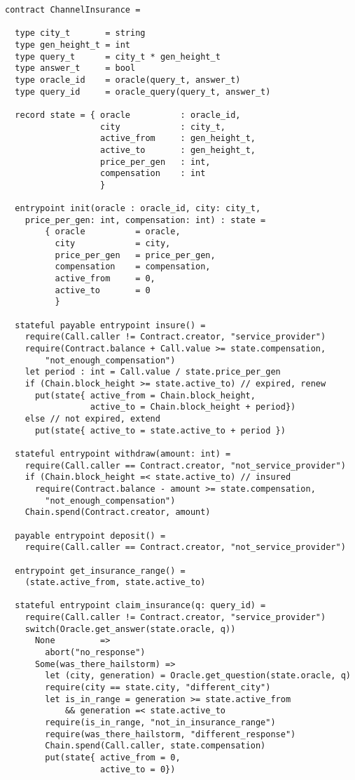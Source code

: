 \begin{verbatim}
contract ChannelInsurance =

  type city_t       = string
  type gen_height_t = int
  type query_t      = city_t * gen_height_t
  type answer_t     = bool
  type oracle_id    = oracle(query_t, answer_t)
  type query_id     = oracle_query(query_t, answer_t)

  record state = { oracle          : oracle_id,
                   city            : city_t,
                   active_from     : gen_height_t,
                   active_to       : gen_height_t,
                   price_per_gen   : int,
                   compensation    : int
                   }

  entrypoint init(oracle : oracle_id, city: city_t, 
    price_per_gen: int, compensation: int) : state =
        { oracle          = oracle,
          city            = city,
          price_per_gen   = price_per_gen,
          compensation    = compensation,
          active_from     = 0,
          active_to       = 0
          }

  stateful payable entrypoint insure() =
    require(Call.caller != Contract.creator, "service_provider")
    require(Contract.balance + Call.value >= state.compensation, 
        "not_enough_compensation")
    let period : int = Call.value / state.price_per_gen
    if (Chain.block_height >= state.active_to) // expired, renew
      put(state{ active_from = Chain.block_height,
                 active_to = Chain.block_height + period})
    else // not expired, extend
      put(state{ active_to = state.active_to + period })

  stateful entrypoint withdraw(amount: int) =
    require(Call.caller == Contract.creator, "not_service_provider")
    if (Chain.block_height =< state.active_to) // insured
      require(Contract.balance - amount >= state.compensation, 
        "not_enough_compensation")
    Chain.spend(Contract.creator, amount)

  payable entrypoint deposit() =
    require(Call.caller == Contract.creator, "not_service_provider")

  entrypoint get_insurance_range() =
    (state.active_from, state.active_to)

  stateful entrypoint claim_insurance(q: query_id) =
    require(Call.caller != Contract.creator, "service_provider")
    switch(Oracle.get_answer(state.oracle, q))
      None         =>
        abort("no_response")
      Some(was_there_hailstorm) =>
        let (city, generation) = Oracle.get_question(state.oracle, q)
        require(city == state.city, "different_city")
        let is_in_range = generation >= state.active_from 
            && generation =< state.active_to
        require(is_in_range, "not_in_insurance_range")
        require(was_there_hailstorm, "different_response")
        Chain.spend(Call.caller, state.compensation)
        put(state{ active_from = 0,
                   active_to = 0})

\end{verbatim}

